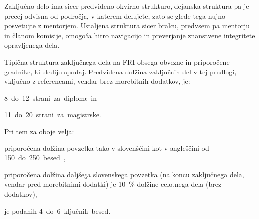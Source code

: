 \documentclass[9pt]{style/friteza}
\begin{document}
Zaključno delo ima sicer predvideno okvirno strukturo, dejanska struktura pa je precej odvisna od področja, v katerem delujete, zato se glede tega nujno posvetujte z mentorjem. Ustaljena struktura sicer bralcu, predvsem pa mentorju in članom komisije, omogoča hitro navigacijo in preverjanje znanstvene integritete opravljenega dela.

Tipična struktura zaključnega dela na FRI obsega obvezne in priporočene gradnike, ki sledijo spodaj. Predvidena dolžina zaključnih del v tej predlogi, vključno z referencami, vendar brez morebitnih dodatkov, je:
\begin{compactitemize}
\item \qty{8} do \qty{12} strani za diplome in
\item \qty{11} do \qty{20} strani za magistrske.
\end{compactitemize}

Pri tem za oboje velja:
\begin{compactitemize}
\item priporočena dolžina povzetka tako v slovenščini kot v angleščini od \qty{150} do \qty{250} besed,
\item priporočena dolžina daljšega slovenskega povzetka (na koncu zaključnega dela, vendar pred morebitnimi dodatki) je \qty{10}{\percent} dolžine celotnega dela (brez dodatkov),
\item je podanih \qty{4} do \qty{6} ključnih besed.
\end{compactitemize}
 
\end{document}
